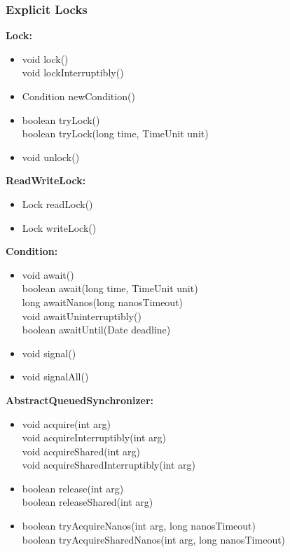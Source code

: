 \documentclass[]{usiinfthesis}
\begin{document}
{\subsubsection{Explicit Locks}

\noindent
\textbf{Lock:}
\begin{itemize}
    \item   void lock()
     \mbox{}\\ void lockInterruptibly()
    \item   Condition newCondition()
    \item   boolean tryLock()
     \mbox{}\\ boolean tryLock(long time, TimeUnit unit)
    \item   void unlock()
\end{itemize}


\noindent
\textbf{ReadWriteLock:}
\begin{itemize}
    \item   Lock readLock()
    \item   Lock writeLock()
\end{itemize}


\noindent
\textbf{Condition:}
\begin{itemize}
    \item   void await()
     \mbox{}\\ boolean await(long time, TimeUnit unit)
     \mbox{}\\ long awaitNanos(long nanosTimeout)
     \mbox{}\\ void awaitUninterruptibly()
     \mbox{}\\ boolean awaitUntil(Date deadline)
    \item   void signal()
    \item   void signalAll()
\end{itemize}


\noindent
\textbf{AbstractQueuedSynchronizer:}
\begin{itemize}
    \item   void acquire(int arg)
     \mbox{}\\ void acquireInterruptibly(int arg)
     \mbox{}\\ void acquireShared(int arg)
     \mbox{}\\ void acquireSharedInterruptibly(int arg)
    \item   boolean release(int arg)
     \mbox{}\\ boolean releaseShared(int arg)
    \item   boolean tryAcquireNanos(int arg, long nanosTimeout)
     \mbox{}\\ boolean tryAcquireSharedNanos(int arg, long nanosTimeout)
\end{itemize}


}
\end{document}
